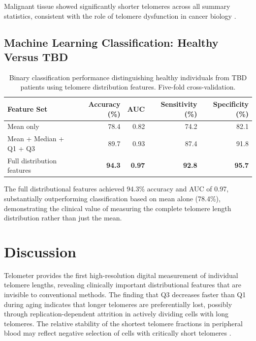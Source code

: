 \documentclass[11pt]{article}
\begin{document}
Malignant tissue showed significantly shorter telomeres across all summary statistics, consistent with the role of telomere dysfunction in cancer biology \citep{hanahan2011hallmarks, shay2012role}.

\subsection{Machine Learning Classification: Healthy Versus TBD}

\begin{table}[H]
\centering
\caption{Binary classification performance distinguishing healthy individuals from TBD patients using telomere distribution features. Five-fold cross-validation.}
\label{tab:ml}
\begin{tabular}{lrrrr}
\toprule
\textbf{Feature Set} & \textbf{Accuracy (\%)} & \textbf{AUC} & \textbf{Sensitivity (\%)} & \textbf{Specificity (\%)} \\
\midrule
Mean only & 78.4 & 0.82 & 74.2 & 82.1 \\
Mean + Median + Q1 + Q3 & 89.7 & 0.93 & 87.4 & 91.8 \\
Full distribution features & \textbf{94.3} & \textbf{0.97} & \textbf{92.8} & \textbf{95.7} \\
\bottomrule
\end{tabular}
\end{table}

The full distributional features achieved 94.3\% accuracy and AUC of 0.97, substantially outperforming classification based on mean alone (78.4\%), demonstrating the clinical value of measuring the complete telomere length distribution rather than just the mean.

\section{Discussion}

Telometer provides the first high-resolution digital measurement of individual telomere lengths, revealing clinically important distributional features that are invisible to conventional methods. The finding that Q3 decreases faster than Q1 during aging indicates that longer telomeres are preferentially lost, possibly through replication-dependent attrition in actively dividing cells with long telomeres. The relative stability of the shortest telomere fractions in peripheral blood may reflect negative selection of cells with critically short telomeres \citep{allsopp1992telomere, demanelis2020determinants}.
\end{document}

